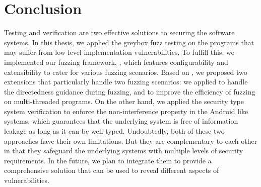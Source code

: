 
\chapter{Conclusion} \label{ch:conclusion}


Testing and verification are two effective solutions to securing the software systems. In this thesis, we applied the greybox fuzz testing on the programs that may suffer from low level implementation vulnerabilities. To fulfill this, we implemented our fuzzing framework, \FOT, which features configurability and extensibility to cater for various fuzzing scenarios. Based on \FOT, we proposed two extensions that particularly handle two fuzzing scenarios: we applied \dFOT to handle the directedness guidance during fuzzing, and \mtfuzz to improve the efficiency of fuzzing on multi-threaded programs. On the other hand, we applied the security type system verification to enforce the non-interference property in the Android like systems, which guarantees that the underlying system is free of information leakage as long as it can be well-typed. Undoubtedly, both of these two approaches have their own limitations. But they are complementary to each other in that they safeguard the underlying systems with multiple levels of security requirements. In the future, we plan to integrate them to provide a comprehensive solution that can be used to reveal different aspects of vulnerabilities.
